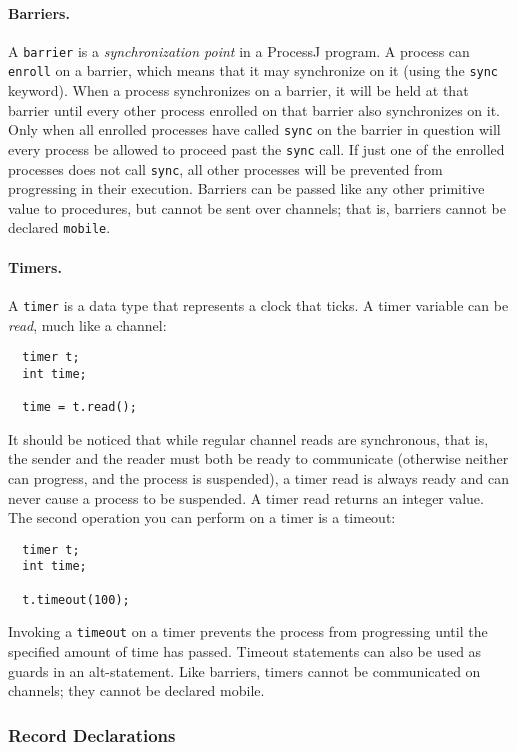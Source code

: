 \documentclass[pdflatex,11pt,letter]{article}
\begin{document}
\paragraph{Barriers.}
A {\tt barrier} is a {\em synchronization point} in a ProcessJ program. A process can {\tt enroll} on a barrier, which means that it may synchronize on it (using the {\tt sync} keyword). When a process synchronizes on a barrier, it will be held at that barrier until every other process enrolled on that barrier also synchronizes on it. Only when all enrolled processes have called {\tt sync} on the barrier in question will every process be allowed to proceed past the {\tt sync} call. If just one of the enrolled processes does not call {\tt sync}, all other processes will be prevented from progressing in their execution. Barriers can be passed like any other primitive value to procedures, but cannot be sent over channels; that is, barriers cannot be declared {\tt mobile}.

\paragraph{Timers.} 
A {\tt timer} is a data type that represents a clock that ticks. A timer variable can be {\em read}, much like a channel:
\begin{verbatim}
  timer t;
  int time;

  time = t.read();
\end{verbatim}
It should be noticed that while regular channel reads are synchronous, that is, the sender and the reader must both be ready to communicate (otherwise neither can progress, and the process is suspended), a timer read is always ready and can never cause a process to be suspended. A timer read returns an integer value. The second operation you can perform on a timer is a timeout:
\begin{verbatim}
  timer t;
  int time;

  t.timeout(100);
\end{verbatim}
Invoking a {\tt timeout} on a timer prevents the process from progressing until the specified amount of time has passed. %
Timeout statements can also be used as guards in an alt-statement. Like barriers, timers cannot be communicated on channels; they cannot be declared mobile.

\subsubsection{Record Declarations}
\end{document}

